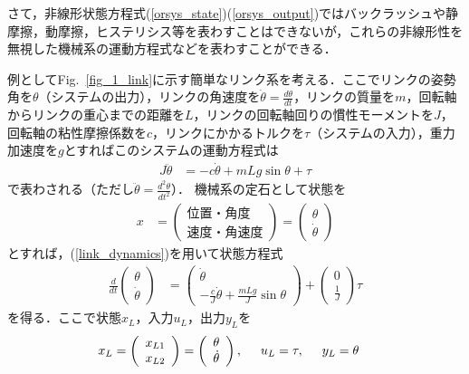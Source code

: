 さて，非線形状態方程式(\ref{orsys_state})(\ref{orsys_output})ではバックラッシュや静摩擦，動摩擦，ヒステリシス等を表わすことはできないが，これらの非線形性を無視した機械系の運動方程式などを表わすことができる．


例としてFig.~\ref{fig_1_link}に示す簡単なリンク系を考える．ここでリンクの姿勢角を$\theta$（システムの出力），リンクの角速度を$\dot{\theta} = \frac{d \theta}{dt}$，リンクの質量を$m$，回転軸からリンクの重心までの距離を$L$，リンクの回転軸回りの慣性モーメントを$J$，回転軸の粘性摩擦係数を$c$，リンクにかかるトルクを$\tau$（システムの入力），重力加速度を$g$とすればこのシステムの運動方程式は
\begin{align}
	J \ddot{\theta} &=  -c \dot{\theta} 
				+ m L g \sin \theta 
				+ \tau
\label{link_dynamics}
\end{align}
で表わされる（ただし$\ddot{\theta} = \frac{d^2 \theta}{dt^2}$）．
機械系の定石として状態を
\begin{align}
	x&
	=	\left(\begin{array}{c} 
			\mbox{位置・角度} \\ 
			\mbox{速度・角速度}
		\end{array}\right)
	=	\left(\begin{array}{c} 
			\theta \\ 
			\dot{\theta} 
		\end{array}\right)
\end{align}
とすれば，(\ref{link_dynamics})を用いて状態方程式
\begin{align}
	\frac{d}{dt} \left(\begin{array}{c} 
			\theta \\ 
			\dot{\theta} 
		      \end{array}\right)
			&=  \left(\begin{array}{c}
				\dot{\theta} \\
				- \frac{c}{J} \dot{\theta}
				+ \frac{m L g}{J} \sin \theta 
 			      \end{array}\right)
				+ \left(\begin{array}{c}
					0 \\
					\frac{1}{J}
				  \end{array}\right)
				  \tau
\label{link_orsys}
\end{align}
を得る．ここで状態$x_L$，入力$u_L$，出力$y_L$を
\begin{align}
	x_L &= \left(\begin{array}{c} 
			x_{L1} \\
			x_{L2} 
		   \end{array}\right) 
			= \left(\begin{array}{c} 
					\theta \\ 
					\dot{\theta} 
			 	\end{array}\right)
,\hspace{5mm}
	u_L = \tau
,\hspace{5mm}
	y_L= \theta
\end{align}
